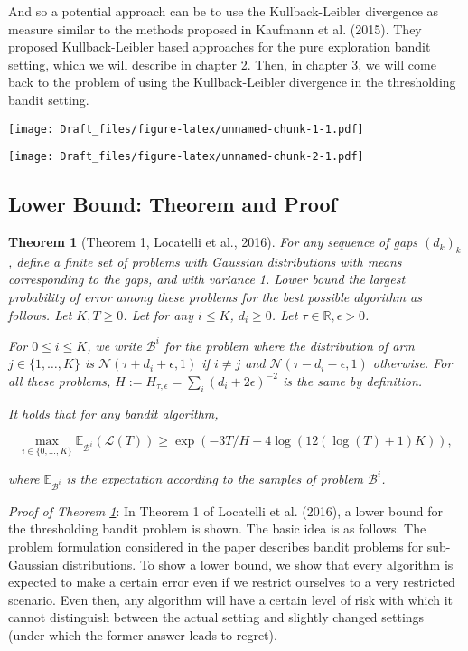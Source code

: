\documentclass[12pt,]{article}
\newtheorem{theorem}{Theorem}
\begin{document}
And so a potential approach can be to use the Kullback-Leibler
divergence as measure similar to the methods proposed in Kaufmann et al.
(2015). They proposed Kullback-Leibler based approaches for the pure
exploration bandit setting, which we will describe in chapter 2. Then,
in chapter 3, we will come back to the problem of using the
Kullback-Leibler divergence in the thresholding bandit setting.

\texttt{[image: Draft\_files/figure-latex/unnamed-chunk-1-1.pdf]}

\texttt{[image: Draft\_files/figure-latex/unnamed-chunk-2-1.pdf]}

\subsection{Lower Bound: Theorem and
Proof}\label{lower-bound-theorem-and-proof}

\begin{theorem}[Theorem 1, Locatelli et al., 2016] 
\label{theorem:Locatelli2016Theorem1}
For any sequence of gaps $(d_k)_k$, define a finite set of problems with Gaussian distributions with means corresponding to the gaps, and with variance 1. Lower bound the largest probability of error among these problems for the best possible algorithm as follows. Let $K,T \geq 0$. Let for any $i \leq K$, $d_i \geq 0$. Let $\tau \in \mathbb{R}, \epsilon > 0$.

For $0 \leq i \leq K$, we write $\mathcal{B}^i$ for the problem where the distribution of arm $j \in \{1, \dots, K\}$ is $\mathcal{N}(\tau+d_i+\epsilon, 1)$ if $i \neq j$ and $\mathcal{N}(\tau-d_i-\epsilon, 1)$ otherwise. For all these problems, $H := H_{\tau, \epsilon} = \sum_i (d_i+2\epsilon)^{-2}$ is the same by definition.

It holds that for any bandit algorithm,

\begin{equation*}
\max_{i \in \{0, \dots, K\}} \mathbb{E}_{\mathcal{B}^i} (\mathcal{L}(T)) \geq \exp(-3T/H-4 \log(12(\log(T)+1)K)),
\end{equation*}

where $\mathbb{E}_{\mathcal{B}^i}$ is the expectation according to the samples of problem $\mathcal{B}^i$.
\end{theorem}

\emph{Proof of Theorem \ref{theorem:Locatelli2016Theorem1}}: In Theorem
1 of Locatelli et al. (2016), a lower bound for the thresholding bandit
problem is shown. The basic idea is as follows. The problem formulation
considered in the paper describes bandit problems for sub-Gaussian
distributions. To show a lower bound, we show that every algorithm is
expected to make a certain error even if we restrict ourselves to a very
restricted scenario. Even then, any algorithm will have a certain level
of risk with which it cannot distinguish between the actual setting and
slightly changed settings (under which the former answer leads to
regret).
\end{document}

